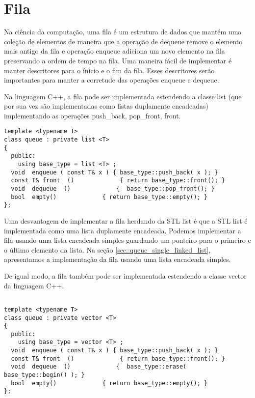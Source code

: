 \chapter{Fila}

Na ciência da computação, uma fila é um estrutura de dados que mantém uma coleção de elementos de maneira que a operação de dequeue remove o elemento mais antigo da fila e operação enqueue adiciona um novo elemento na fila preservando a ordem de tempo na fila. Uma maneira fácil de implementar é manter descritores para o ínicio e o fim da fila. Esses descritores serão importantes para manter a corretude das operações enqueue e dequeue.

Na linguagem C++, a fila pode ser implementada estendendo a classe list (que por sua vez são implementadas como listas duplamente encadeadas) implementando as operações push\_back, pop\_front, front.

\begin{verbatim}
template <typename T> 
class queue : private list <T>
{
  public:
    using base_type = list <T> ; 
  void  enqueue ( const T& x ) { base_type::push_back( x ); }
  const T& front  ()             { return base_type::front(); }
  void  dequeue  ()             {  base_type::pop_front(); }
  bool  empty()             { return base_type::empty(); }
};
\end{verbatim}

Uma desvantagem de implementar a fila herdando da STL list é que a STL list é implementada como uma lista duplamente encadeada. Podemos implementar a fila usando uma lista encadeada simples guardando um ponteiro para o primeiro e o último elemento da lista. Na seção \ref{sec::queue_single_linked_list}, apresentamos a implementação da fila usando uma lista encadeada simples.


De igual modo, a fila também pode ser implementada estendendo a classe vector da linguagem C++. 

\begin{verbatim}

template <typename T> 
class queue : private vector <T>
{
  public:
    using base_type = vector <T> ; 
  void  enqueue ( const T& x ) { base_type::push_back( x ); }
  const T& front  ()             { return base_type::front(); }
  void  dequeue  ()             {  base_type::erase( base_type::begin() ); }
  bool  empty()             { return base_type::empty(); }
};

\end{verbatim}

